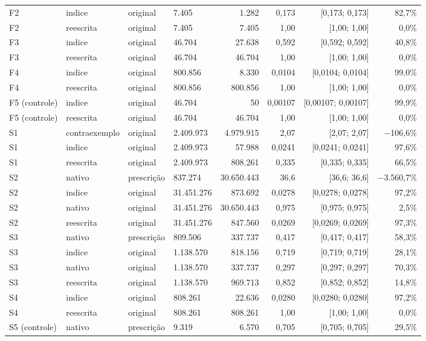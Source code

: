 {\begin{tabular}{llllrrrr}
F2 & indice & original & 7.405 & 1.282 & 0,173 & [0,173; 0,173] & 82,7\% \\
F2 & reescrita & original & 7.405 & 7.405 & 1,00 & [1,00; 1,00] & 0,0\% \\
F3 & indice & original & 46.704 & 27.638 & 0,592 & [0,592; 0,592] & 40,8\% \\
F3 & reescrita & original & 46.704 & 46.704 & 1,00 & [1,00; 1,00] & 0,0\% \\
F4 & indice & original & 800.856 & 8.330 & 0,0104 & [0,0104; 0,0104] & 99,0\% \\
F4 & reescrita & original & 800.856 & 800.856 & 1,00 & [1,00; 1,00] & 0,0\% \\
F5 (controle) & indice & original & 46.704 & 50 & 0,00107 & [0,00107; 0,00107] & 99,9\% \\
F5 (controle) & reescrita & original & 46.704 & 46.704 & 1,00 & [1,00; 1,00] & 0,0\% \\
S1 & contraexemplo & original & 2.409.973 & 4.979.915 & 2,07 & [2,07; 2,07] & $-$106,6\% \\
S1 & indice & original & 2.409.973 & 57.988 & 0,0241 & [0,0241; 0,0241] & 97,6\% \\
S1 & reescrita & original & 2.409.973 & 808.261 & 0,335 & [0,335; 0,335] & 66,5\% \\
S2 & nativo & prescrição & 837.274 & 30.650.443 & 36,6 & [36,6; 36,6] & $-$3.560,7\% \\
S2 & indice & original & 31.451.276 & 873.692 & 0,0278 & [0,0278; 0,0278] & 97,2\% \\
S2 & nativo & original & 31.451.276 & 30.650.443 & 0,975 & [0,975; 0,975] & 2,5\% \\
S2 & reescrita & original & 31.451.276 & 847.560 & 0,0269 & [0,0269; 0,0269] & 97,3\% \\
S3 & nativo & prescrição & 809.506 & 337.737 & 0,417 & [0,417; 0,417] & 58,3\% \\
S3 & indice & original & 1.138.570 & 818.156 & 0,719 & [0,719; 0,719] & 28,1\% \\
S3 & nativo & original & 1.138.570 & 337.737 & 0,297 & [0,297; 0,297] & 70,3\% \\
S3 & reescrita & original & 1.138.570 & 969.713 & 0,852 & [0,852; 0,852] & 14,8\% \\
S4 & indice & original & 808.261 & 22.636 & 0,0280 & [0,0280; 0,0280] & 97,2\% \\
S4 & reescrita & original & 808.261 & 808.261 & 1,00 & [1,00; 1,00] & 0,0\% \\
S5 (controle) & nativo & prescrição & 9.319 & 6.570 & 0,705 & [0,705; 0,705] & 29,5\% \\

\end{tabular}}
